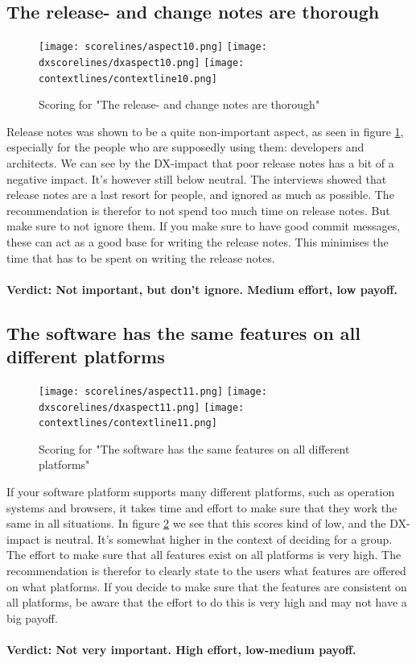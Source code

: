 \documentclass{cslthse-msc}
\begin{document}
    \subsection{The release- and change notes are thorough}
    \begin{figure}[H]
        \centering
        \texttt{[image: scorelines/aspect10.png]}
        \texttt{[image: dxscorelines/dxaspect10.png]}
        \texttt{[image: contextlines/contextline10.png]}
        \caption{Scoring for "The release- and change notes are thorough"}
        \label{fig:aspect10}
    \end{figure}
    Release notes was shown to be a quite non-important aspect, as seen in figure \ref{fig:aspect10}, especially for the people who are supposedly using them: developers and architects. We can see by the DX-impact that poor release notes has a bit of a negative impact. It's however still below neutral. The interviews showed that release notes are a last resort for people, and ignored as much as possible. The recommendation is therefor to not spend too much time on release notes. But make sure to not ignore them. If you make sure to have good commit messages, these can act as a good base for writing the release notes. This minimises the time that has to be spent on writing the release notes.\\ \\
    \textbf{Verdict: Not important, but don't ignore. Medium effort, low payoff.}

    \subsection{The software has the same features on all different platforms}
    \begin{figure}[H]
        \centering
        \texttt{[image: scorelines/aspect11.png]}
        \texttt{[image: dxscorelines/dxaspect11.png]}
        \texttt{[image: contextlines/contextline11.png]}
        \caption{Scoring for "The software has the same features on all different platforms"}
        \label{fig:aspect11}
    \end{figure}
    If your software platform supports many different platforms, such as operation systems and browsers, it takes time and effort to make sure that they work the same in all situations. In figure \ref{fig:aspect11} we see that this scores kind of low, and the DX-impact is neutral. It's somewhat higher in the context of deciding for a group. The effort to make sure that all features exist on all platforms is very high. The recommendation is therefor to clearly state to the users what features are offered on what platforms. If you decide to make sure that the features are consistent on all platforms, be aware that the effort to do this is very high and may not have a big payoff. \\ \\
    \textbf{Verdict: Not very important. High effort, low-medium payoff.}
\end{document}
